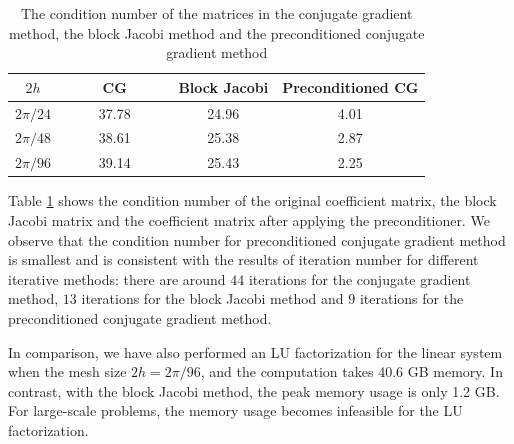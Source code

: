 \begin{table}[htbp]
	\begin{center}
		\begin{tabular}{|c|c c c|}
			\hline
			$2h$   & ~~~~ CG ~~~~& Block Jacobi & Preconditioned CG  \\
			\hline
			$2\pi/24$ &37.78& 24.96& 4.01\\
			\hline
			$2\pi/48$ &38.61 & 25.38 & 2.87\\
			\hline 
			$2\pi/96$ &39.14 &25.43 & 2.25\\
			\hline
		\end{tabular}
	\end{center}
		\caption{The condition number of the matrices in the conjugate gradient method, the block Jacobi method and the preconditioned conjugate gradient method}\label{condition_number}
\end{table} 
Table \ref{condition_number} shows the condition number of the original coefficient matrix, the block Jacobi matrix and the coefficient matrix after applying the preconditioner. We observe that the condition number for preconditioned conjugate gradient method is smallest and is consistent with the results of iteration number for different iterative methods: there are around $44$ iterations for the conjugate gradient method, $13$ iterations for the block Jacobi method and $9$ iterations for the preconditioned conjugate gradient method.

In comparison, we have also performed an LU factorization for the linear system when the mesh size $2h = 2\pi/96$, and the computation takes 40.6 GB memory. In contrast, with the block Jacobi method, the peak memory usage is only 1.2 GB. For large-scale problems, the memory usage becomes infeasible for the LU factorization. 

